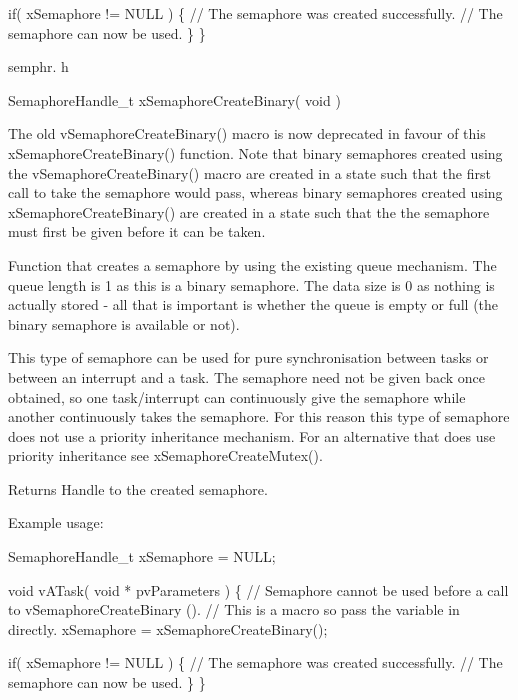 \begin{DoxyPre}   if( xSemaphore != NULL )
   \{
       // The semaphore was created successfully.
       // The semaphore can now be used.
   \}
\}
\end{DoxyPre}


semphr. h 
\begin{DoxyPre}SemaphoreHandle\_t xSemaphoreCreateBinary( void )\end{DoxyPre}


The old v\+Semaphore\+Create\+Binary() macro is now deprecated in favour of this x\+Semaphore\+Create\+Binary() function. Note that binary semaphores created using the v\+Semaphore\+Create\+Binary() macro are created in a state such that the first call to \textquotesingle{}take\textquotesingle{} the semaphore would pass, whereas binary semaphores created using x\+Semaphore\+Create\+Binary() are created in a state such that the the semaphore must first be \textquotesingle{}given\textquotesingle{} before it can be \textquotesingle{}taken\textquotesingle{}.

Function that creates a semaphore by using the existing queue mechanism. The queue length is 1 as this is a binary semaphore. The data size is 0 as nothing is actually stored -\/ all that is important is whether the queue is empty or full (the binary semaphore is available or not).

This type of semaphore can be used for pure synchronisation between tasks or between an interrupt and a task. The semaphore need not be given back once obtained, so one task/interrupt can continuously \textquotesingle{}give\textquotesingle{} the semaphore while another continuously \textquotesingle{}takes\textquotesingle{} the semaphore. For this reason this type of semaphore does not use a priority inheritance mechanism. For an alternative that does use priority inheritance see x\+Semaphore\+Create\+Mutex().

\begin{DoxyReturn}{Returns}
Handle to the created semaphore.
\end{DoxyReturn}
Example usage\+: 
\begin{DoxyPre}
SemaphoreHandle\_t xSemaphore = NULL;\end{DoxyPre}



\begin{DoxyPre}void vATask( void * pvParameters )
\{
   // Semaphore cannot be used before a call to vSemaphoreCreateBinary ().
   // This is a macro so pass the variable in directly.
   xSemaphore = xSemaphoreCreateBinary();\end{DoxyPre}



\begin{DoxyPre}   if( xSemaphore != NULL )
   \{
       // The semaphore was created successfully.
       // The semaphore can now be used.
   \}
\}
\end{DoxyPre}
 